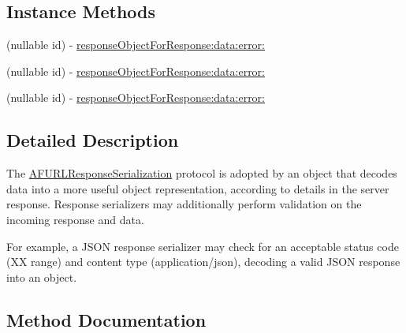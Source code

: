\subsection*{Instance Methods}
\begin{DoxyCompactItemize}
\item 
(nullable id) -\/ \mbox{\hyperlink{protocol_a_f_u_r_l_response_serialization_01-p_a3b194fdeb44f6878e12a473e5cf8d022}{response\+Object\+For\+Response\+:data\+:error\+:}}
\item 
(nullable id) -\/ \mbox{\hyperlink{protocol_a_f_u_r_l_response_serialization_01-p_a3b194fdeb44f6878e12a473e5cf8d022}{response\+Object\+For\+Response\+:data\+:error\+:}}
\item 
(nullable id) -\/ \mbox{\hyperlink{protocol_a_f_u_r_l_response_serialization_01-p_a3b194fdeb44f6878e12a473e5cf8d022}{response\+Object\+For\+Response\+:data\+:error\+:}}
\end{DoxyCompactItemize}


\subsection{Detailed Description}
The {\ttfamily \mbox{\hyperlink{class_a_f_u_r_l_response_serialization-p}{A\+F\+U\+R\+L\+Response\+Serialization}}} protocol is adopted by an object that decodes data into a more useful object representation, according to details in the server response. Response serializers may additionally perform validation on the incoming response and data.

For example, a J\+S\+ON response serializer may check for an acceptable status code ({\+XX} range) and content type ({\ttfamily application/json}), decoding a valid J\+S\+ON response into an object. 

\subsection{Method Documentation}
\mbox{\label{protocol_a_f_u_r_l_response_serialization_01-p_a3b194fdeb44f6878e12a473e5cf8d022}} 
